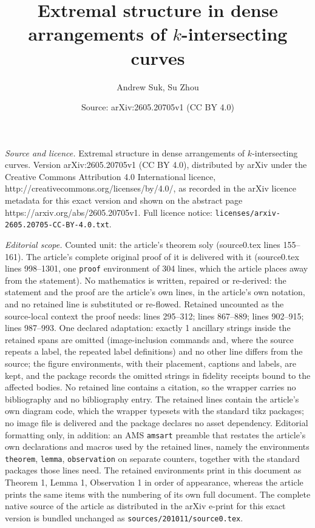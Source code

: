 \documentclass[10pt,a4paper]{amsart}
\title{Extremal structure in dense arrangements of $k$-intersecting curves}
\author{Andrew Suk, Su Zhou}
\date{Source: arXiv:2605.20705v1 (CC BY 4.0)}
\begin{document}
\maketitle

\noindent\emph{Source and licence.} Extremal structure in dense arrangements of $k$-intersecting curves. Version arXiv:2605.20705v1 (CC BY 4.0), distributed by arXiv under the Creative Commons Attribution 4.0 International licence, http://creativecommons.org/licenses/by/4.0/, as recorded in the arXiv licence metadata for this exact version and shown on the abstract page https://arxiv.org/abs/2605.20705v1. Full licence notice: \texttt{licenses/arxiv-2605.20705-CC-BY-4.0.txt}.\par\smallskip

\noindent\textit{Editorial scope.} Counted unit: the article's theorem soly (source0.tex lines 155--161). The article's complete original proof of it is delivered with it (source0.tex lines 998--1301, one \texttt{proof} environment of 304 lines, which the article places away from the statement). No mathematics is written, repaired or re-derived: the statement and the proof are the article's own lines, in the article's own notation, and no retained line is substituted or re-flowed.  Retained uncounted as the source-local context the proof needs: lines 295--312; lines 867--889; lines 902--915; lines 987--993.  One declared adaptation: exactly 1 ancillary strings inside the retained spans are omitted (image-inclusion commands and, where the source repeats a label, the repeated label definitions) and no other line differs from the source; the figure environments, with their placement, captions and labels, are kept, and the package records the omitted strings in fidelity receipts bound to the affected bodies.  No retained line contains a citation, so the wrapper carries no bibliography and no bibliography entry.  The retained lines contain the article's own diagram code, which the wrapper typesets with the standard tikz packages; no image file is delivered and the package declares no asset dependency.  Editorial formatting only, in addition: an AMS \texttt{amsart} preamble that restates the article's own declarations and macros used by the retained lines, namely the environments \texttt{theorem}, \texttt{lemma}, \texttt{observation} on separate counters, together with the standard packages those lines need.  The retained environments print in this document as Theorem 1, Lemma 1, Observation 1 in order of appearance, whereas the article prints the same items with the numbering of its own full document.  The complete native source of the article as distributed in the arXiv e-print for this exact version is bundled unchanged as \texttt{sources/201011/source0.tex}.
\end{document}
